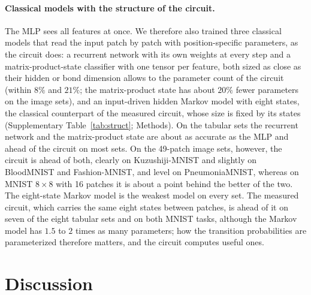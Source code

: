 \documentclass[11pt]{article}
\begin{document}
\paragraph{Classical models with the structure of the circuit.}
The MLP sees all features at once. We therefore also trained three classical models that read the input patch by patch with position-specific parameters, as the circuit does: a recurrent network with its own weights at every step and a matrix-product-state classifier with one tensor per feature, both sized as close as their hidden or bond dimension allows to the parameter count of the circuit (within $8\%$ and $21\%$; the matrix-product state has about $20\%$ fewer parameters on the image sets), and an input-driven hidden Markov model with eight states, the classical counterpart of the measured circuit, whose size is fixed by its states (Supplementary Table~\ref{tab:struct}; Methods). On the tabular sets the recurrent network and the matrix-product state are about as accurate as the MLP and ahead of the circuit on most sets. On the 49-patch image sets, however, the circuit is ahead of both, clearly on Kuzushiji-MNIST and slightly on BloodMNIST and Fashion-MNIST, and level on PneumoniaMNIST, whereas on MNIST $8\times8$ with 16 patches it is about a point behind the better of the two. The eight-state Markov model is the weakest model on every set. The measured circuit, which carries the same eight states between patches, is ahead of it on seven of the eight tabular sets and on both MNIST tasks, although the Markov model has $1.5$ to $2$ times as many parameters; how the transition probabilities are parameterized therefore matters, and the circuit computes useful ones.

%

\section{Discussion}
\label{sec:discussion}
\end{document}

